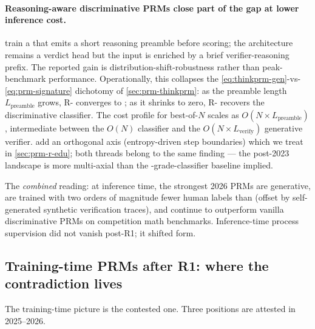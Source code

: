 \paragraph{Reasoning-aware discriminative PRMs close part of the gap at
lower inference cost.}  train a 
that emits a short reasoning preamble before scoring; the architecture
remains a verdict head but the input is enriched by a brief
verifier-reasoning prefix. The reported gain is
distribution-shift-robustness rather than peak-benchmark
performance. Operationally, this collapses the
\cref{eq:thinkprm-gen}-vs-\cref{eq:prm-signature} dichotomy of
\cref{sec:prm-thinkprm}: as the preamble length $L_{\text{preamble}}$
grows, R- converges to ; as it shrinks to zero, R-
recovers the discriminative classifier. The cost
profile for best-of-$N$ scales as $O(N \times L_{\text{preamble}})$,
intermediate between the $O(N)$ classifier and the
$O(N \times L_{\text{verify}})$ generative verifier. 
add an orthogonal axis (entropy-driven step boundaries) which we treat
in \cref{sec:prm-r-edu}; both threads belong to the same finding ---
the post-2023  landscape is more multi-axial than the
-grade-classifier baseline implied.

The \emph{combined} reading: at inference time, the strongest 2026
PRMs are generative, are trained with two orders of magnitude fewer
human labels than  (offset by self-generated synthetic
verification traces), and continue to outperform vanilla
discriminative PRMs on competition math benchmarks. Inference-time
process supervision did not vanish post-R1; it shifted form.

\subsection{Training-time PRMs after R1: where the contradiction lives}
\label{sec:prm-survival-training}

The training-time picture is the contested one. Three positions are
attested in 2025--2026.

